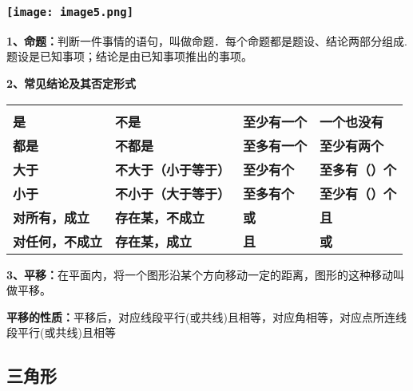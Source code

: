 \hypertarget{ux5b66ux79d1ux7f51www.zxxk.com--ux6559ux80b2ux8d44ux6e90ux95e8ux6237ux63d0ux4f9bux8bd5ux9898ux8bd5ux5377ux6559ux6848ux8bfeux4ef6ux6559ux5b66ux8bbaux6587ux7d20ux6750ux7b49ux5404ux7c7bux6559ux5b66ux8d44ux6e90ux5e93ux4e0bux8f7dux8fd8ux6709ux5927ux91cfux4e30ux5bccux7684ux6559ux5b66ux8d44ux8baf-7}{%
\subsubsection{\texorpdfstring{\protect\texttt{[image: image5.png]}}{学科网(www.zxxk.com)-\/-教育资源门户，提供试题试卷、教案、课件、教学论文、素材等各类教学资源库下载，还有大量丰富的教学资讯！}}\label{ux5b66ux79d1ux7f51www.zxxk.com--ux6559ux80b2ux8d44ux6e90ux95e8ux6237ux63d0ux4f9bux8bd5ux9898ux8bd5ux5377ux6559ux6848ux8bfeux4ef6ux6559ux5b66ux8bbaux6587ux7d20ux6750ux7b49ux5404ux7c7bux6559ux5b66ux8d44ux6e90ux5e93ux4e0bux8f7dux8fd8ux6709ux5927ux91cfux4e30ux5bccux7684ux6559ux5b66ux8d44ux8baf-7}}

\textbf{1、命题：}判断一件事情的语句，叫做命题．每个命题都是题设、结论两部分组成.题设是已知事项；结论是由已知事项推出的事项。

\textbf{2、常见结论及其否定形式}

\begin{longtable}[]{@{}llll@{}}
\toprule
\endhead
& & &\tabularnewline
\textbf{是} & \textbf{不是} & \textbf{至少有一个} &
\textbf{一个也没有}\tabularnewline
\textbf{都是} & \textbf{不都是} & \textbf{至多有一个} &
\textbf{至少有两个}\tabularnewline
\textbf{大于} & \textbf{不大于（小于等于）} & \textbf{至少有个} &
\textbf{至多有（）个}\tabularnewline
\textbf{小于} & \textbf{不小于（大于等于）} & \textbf{至多有个} &
\textbf{至少有（）个}\tabularnewline
\textbf{对所有，成立} & \textbf{存在某，不成立} & \textbf{或} &
\textbf{且}\tabularnewline
\textbf{对任何，不成立} & \textbf{存在某，成立} & \textbf{且} &
\textbf{或}\tabularnewline
\bottomrule
\end{longtable}

\textbf{3、平移：}在平面内，将一个图形沿某个方向移动一定的距离，图形的这种移动叫做平移。

\textbf{平移的性质：}平移后，对应线段平行(或共线)且相等，对应角相等，对应点所连线段平行(或共线)且相等

\hypertarget{ux4e09ux89d2ux5f62}{%
\subsection{\texorpdfstring{
三角形}{ 三角形}}\label{ux4e09ux89d2ux5f62}}

